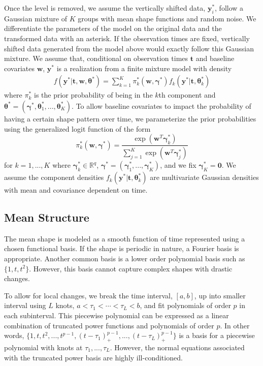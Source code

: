 \documentclass[12pt]{article}
\newcommand{\B}[0]{\mathbf}
\newcommand{\bs}[0]{\boldsymbol}
\begin{document}
Once the level is removed, we assume the vertically shifted data, $\B y_{i}^{*}$, follow a Gaussian mixture of $K$ groups with mean shape functions and random noise. We differentiate the parameters of the model on the original data and the transformed data with an asterisk. If the observation times are fixed, vertically shifted data generated from the model above would exactly follow this Gaussian mixture. We assume that, conditional on observation times $\B t$ and baseline covariates $\B w$, $\B y^{*}$ is a realization from a finite mixture model with density
\begin{align*}
 f(\B y^{*}|\B t,\B w,\bs\theta^{*}) =  \sum^{K}_{k=1}\pi^{*}_{k}(\B w,\bs \gamma^{*})f_{k}( \B y^{*}|\B t,\bs\theta^{*}_{k})
\end{align*}
where $\pi^{*}_{k}$ is the prior probability of being in the $k$th component and $\bs\theta^{*} = (\bs\gamma^{*},\bs\theta^{*}_{1},...,\bs\theta^{*}_{K})$. To allow baseline covariates to impact the probability of having a certain shape pattern over time, we parameterize the prior probabilities using the generalized logit function of the form
$$\pi^{*}_{k}(\B w,\bs\gamma^{*})=\frac{\exp(\B w^{T}\bs\gamma^{*}_{k})}{\sum_{j=1}^{K}\exp(\B w^{T}\bs\gamma^{*}_{j})}$$ 
for $k=1,...,K$ where $\bs \gamma^{*}_{k}\in\mathbb{R}^{q}$, $\bs\gamma^{*} = (\bs\gamma^{*}_{1},...,\bs\gamma^{*}_{K})$, and we fix $\bs\gamma^{*}_{K}=\B 0$. We assume the component densities $f_{k}(\B y^{*}|\B t,\bs\theta^{*}_{k})$ are multivariate Gaussian densities with mean and covariance dependent  on time.

\subsection{Mean Structure}
The mean shape is modeled as a smooth function of time represented using a chosen functional basis. If the shape is periodic in nature, a Fourier basis is appropriate. Another common basis is a lower order polynomial basis such as $\{1, t, t^{2}\}$. However, this basis cannot capture complex shapes with drastic changes. 

To allow for local changes, we break the time interval, $[a,b]$, up into smaller interval using $L$ knots, $a<\tau_{1}<\cdots<\tau_{L}<b$, and fit polynomials of order $p$ in each subinterval. This piecewise polynomial can be expressed as a linear combination of truncated power functions and polynomials of order $p$. In other words,
$\{1,t,t^{2},...,t^{p-1},(t-\tau_{1})_{+}^{p-1},...,(t-\tau_{L})_{+}^{p-1}\}$
is a basis for a piecewise polynomial with knots at $\tau_{1},...,\tau_{L}$. However, the normal equations associated with the truncated power basis are highly ill-conditioned. 
\end{document}
